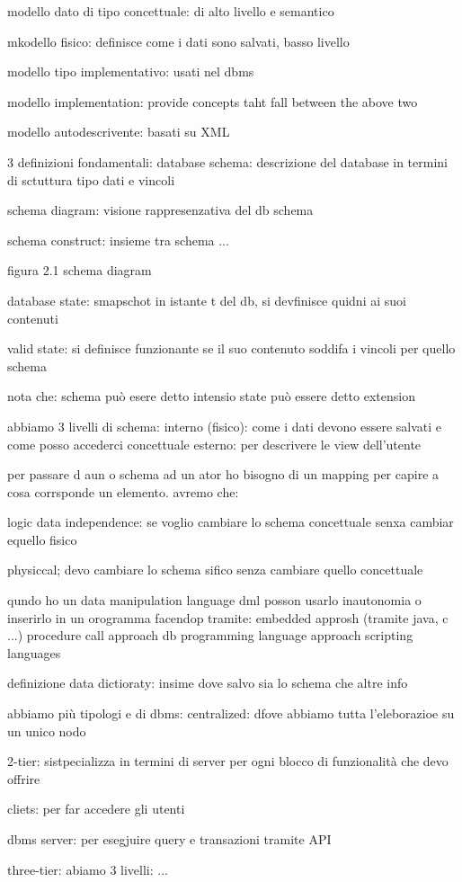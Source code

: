 modello dato di tipo concettuale: di alto livello e semantico

mkodello fisico: definisce come i dati sono salvati, basso livello

modello tipo implementativo: usati nel dbms 

modello implementation: provide concepts taht fall between the above two

modello autodescrivente: basati su XML 



3 definizioni fondamentali:
database schema: descrizione del database in termini di sctuttura tipo dati e vincoli

schema diagram: visione rappresenzativa del db schema

schema construct: insieme tra schema ...


figura 2.1 schema diagram

database state: smapschot in istante t del db, si devfinisce quidni ai suoi contenuti

valid state: si definisce funzionante se il suo contenuto soddifa i vincoli per quello schema

nota che:
schema può esere detto intensio
state può essere detto extension


abbiamo 3 livelli di schema:
interno (fisico): come i dati devono essere salvati e come posso accederci
concettuale
esterno: per descrivere le view dell'utente


per passare d aun o schema ad un ator ho bisogno di un mapping per capire a cosa corrsponde un elemento. avremo che:

logic data independence: se voglio cambiare lo schema concettuale senxa cambiar equello fisico

physiccal; devo cambiare lo schema sifico senza cambiare quello concettuale



qundo ho un data manipulation language dml posson usarlo inautonomia o inserirlo in un orogramma facendop tramite:
embedded approsh (tramite java, c ...)
procedure call approach
db programming language approach
scripting languages


definizione
data dictioraty: insime dove salvo sia lo schema che altre info 



abbiamo più tipologi e di dbms:
centralized: dfove abbiamo tutta l'eleborazioe su un unico nodo

2-tier: sistpecializza in termini di server per ogni blocco di funzionalità che devo offrire

cliets: per far accedere gli utenti

dbms server: per esegjuire query e transazioni tramite API 

three-tier: abiamo 3 livelli: ...


